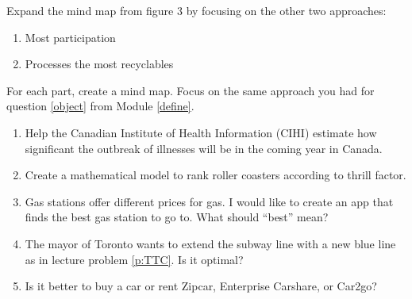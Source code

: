 \begin{exercises}
	\begin{problist}
		\prob
		Expand the mind map from figure 3 by focusing on the other two approaches:
		\begin{enumerate}
			\item Most participation
			\item Processes the most recyclables
		\end{enumerate}

		\prob
	For each part, create a mind map. Focus on the same approach you had for question \ref{object} from Module \ref{define}.
		\begin{enumerate}
			\item Help the Canadian Institute of Health Information (CIHI) estimate how significant the outbreak of illnesses will be in the coming year in Canada.
			\item Create a mathematical model to rank roller coasters according to thrill factor.
			\item Gas stations offer different prices for gas. I would like to create an app that finds the best gas station to go to. What should ``best'' mean?
			\item The mayor of Toronto wants to extend the subway line with a new blue line as in lecture problem \ref{p:TTC}. Is it optimal?
			
			\item Is it better to buy a car or rent Zipcar, Enterprise Carshare, or Car2go?
		
	\end{enumerate}
	\end{problist}
\end{exercises}
